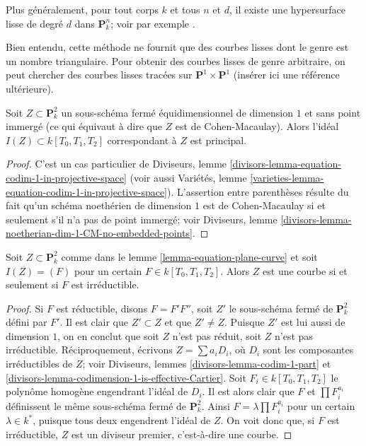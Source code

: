 \medskip\noindent
Plus généralement, pour tout corps $k$ et tous $n$ et $d$, il existe une hypersurface lisse de degré $d$ dans $\mathbf{P}^n_k$; voir par exemple \cite{Poonen}.

\medskip\noindent
Bien entendu, cette méthode ne fournit que des courbes lisses dont le genre est un nombre triangulaire. Pour obtenir des courbes lisses de genre arbitraire, on peut chercher des courbes lisses tracées sur $\mathbf{P}^1 \times \mathbf{P}^1$ (insérer ici une référence ultérieure).

\begin{lemma}
\label{lemma-equation-plane-curve}
Soit $Z \subset \mathbf{P}^2_k$ un sous-schéma fermé équidimensionnel de dimension $1$ et sans point immergé (ce qui équivaut à dire que $Z$ est de Cohen-Macaulay). Alors l'idéal $I(Z) \subset k[T_0, T_1, T_2]$ correspondant à $Z$ est principal.
\end{lemma}

\begin{proof}
C'est un cas particulier de Diviseurs, lemme \ref{divisors-lemma-equation-codim-1-in-projective-space} (voir aussi Variétés, lemme \ref{varieties-lemma-equation-codim-1-in-projective-space}). L'assertion entre parenthèses résulte du fait qu'un schéma noethérien de dimension $1$ est de Cohen-Macaulay si et seulement s'il n'a pas de point immergé; voir Diviseurs, lemme \ref{divisors-lemma-noetherian-dim-1-CM-no-embedded-points}.
\end{proof}

\begin{lemma}
\label{lemma-plane-curve}
Soit $Z \subset \mathbf{P}^2_k$ comme dans le lemme \ref{lemma-equation-plane-curve} et soit $I(Z) = (F)$ pour un certain $F \in k[T_0, T_1, T_2]$. Alors $Z$ est une courbe si et seulement si $F$ est irréductible.
\end{lemma}

\begin{proof}
Si $F$ est réductible, disons $F = F' F''$, soit $Z'$ le sous-schéma fermé de $\mathbf{P}^2_k$ défini par $F'$. Il est clair que $Z' \subset Z$ et que $Z' \not = Z$. Puisque $Z'$ est lui aussi de dimension $1$, on en conclut que soit $Z$ n'est pas réduit, soit $Z$ n'est pas irréductible. Réciproquement, écrivons $Z = \sum a_i D_i$, où $D_i$ sont les composantes irréductibles de $Z$; voir Diviseurs, lemmes \ref{divisors-lemma-codim-1-part} et \ref{divisors-lemma-codimension-1-is-effective-Cartier}. Soit $F_i \in k[T_0, T_1, T_2]$ le polynôme homogène engendrant l'idéal de $D_i$. Il est alors clair que $F$ et $\prod F_i^{a_i}$ définissent le même sous-schéma fermé de $\mathbf{P}^2_k$. Ainsi $F = \lambda \prod F_i^{a_i}$ pour un certain $\lambda \in k^*$, puisque tous deux engendrent l'idéal de $Z$. On voit donc que, si $F$ est irréductible, $Z$ est un diviseur premier, c'est-à-dire une courbe.
\end{proof}

